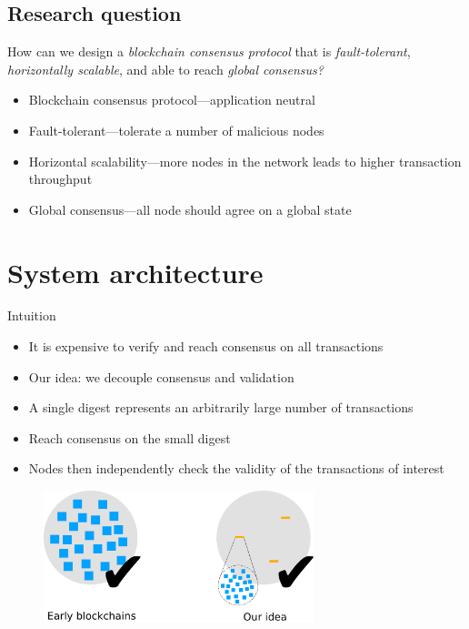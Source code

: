 \documentclass{beamer}
\begin{document}
\subsection{Research question}
\begin{frame}{\subsecname}
  \begin{block}{}
    \Large{
    How can we design a \emph{blockchain consensus protocol} that is \emph{fault-tolerant},
    \emph{horizontally scalable}, and able to reach \emph{global consensus?}
    }
  \end{block}
  \begin{itemize}
    \item Blockchain consensus protocol---application neutral
    \item Fault-tolerant---tolerate a number of malicious nodes
    \item Horizontal scalability---more nodes in the network leads to higher transaction throughput
    \item Global consensus---all node should agree on a global state
  \end{itemize}
\end{frame}

\section{System architecture}
\begin{frame}{Intuition}
  \begin{itemize}
    \item It is expensive to verify and reach consensus on all transactions
    \item Our idea: we decouple consensus and validation
    \item A single digest represents an arbitrarily large number of transactions
    \item Reach consensus on the small digest
    \item Nodes then independently check the validity of the transactions of interest
  \end{itemize}
  \begin{figure}[h]
  \includegraphics[width=0.7\textwidth]{idea}
  \centering
  \end{figure}
\end{frame}
\end{document}
